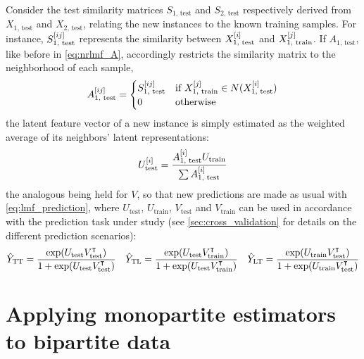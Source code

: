 Consider the test similarity matrices $S_{1\text{, test}}$ and $S_{2\text{, test}}$ respectively derived from $X_\text{1, test}$ and $X_\text{2, test}$, relating the new instances to the known training samples. For instance, $S_{1\text{, test}}^{[ij]}$ represents the similarity between $X_\text{1, test}^{[i]}$ and $X_\text{1, train}^{[j]}$. If $A_\text{1, test}$, like before in \autoref{eq:nrlmf_A}, accordingly restricts the similarity matrix to the neighborhood of each sample,
%
\begin{equation}
    A_\text{1, test}^{[ij]} =
    \begin{cases}
        S_\text{1, test}^{[ij]} & \text{if } X_\text{1, train}^{[j]} \in N(X_\text{1, test}^{[i]})\\
        0 & \text{otherwise}
    \end{cases}
    \label{eq:nrlmf_A_test}
\end{equation}
%
the latent feature vector of a new instance is simply estimated as the weighted average of its neighbors' latent representations:
%
\begin{equation}
    U_\text{test}^{[i]} = \frac{A_\text{1, test}^{[i]} U_\text{train}}{\sum A_\text{1, test}^{[i]}}
\end{equation}
%
the analogous being held for $V$, so that new predictions are made as usual with \autoref{eq:lmf_prediction}, where $U_\text{test}$, $U_\text{train}$, $V_\text{test}$ and $V_\text{train}$ can be used in accordance with the prediction task under study (see \autoref{sec:cross_validation} for details on the different prediction scenarios):
%
\begin{gather}
    \begin{aligned}
        \hat Y_\text{TT} = \frac{\exp(U_\text{test} V_\text{test}^\intercal)}{1 + \exp(U_\text{test} V_\text{test}^\intercal)}&&
        \hat Y_\text{TL} = \frac{\exp(U_\text{test} V_\text{train}^\intercal)}{1 + \exp(U_\text{test} V_\text{train}^\intercal)}&&
        \hat Y_\text{LT} = \frac{\exp(U_\text{train} V_\text{test}^\intercal)}{1 + \exp(U_\text{train} V_\text{test}^\intercal)}
    \end{aligned}
\end{gather}



\section{Applying monopartite estimators to bipartite data}
\label{sec:common_approaches}

